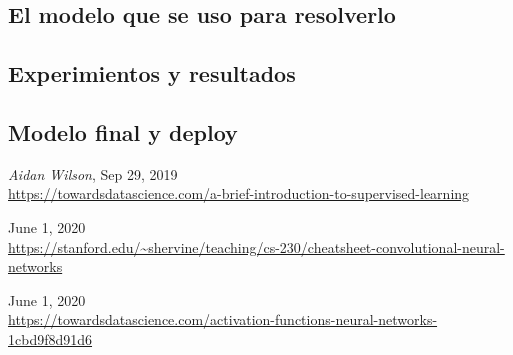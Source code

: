 \documentclass[10pt, fleqn, journal]{IEEEtran}
\theoremstyle{break}                                            %
\begin{document}
    \subsection{El modelo que se uso para resolverlo}

    \subsection{Experimientos y resultados}

    \subsection{Modelo final y deploy}

  \begin{thebibliography}{10}

      \textit{Aidan Wilson}, 
      Sep 29, 2019 \\
      \url{https://towardsdatascience.com/a-brief-introduction-to-supervised-learning}

      June 1, 2020 \\
      \url{https://stanford.edu/~shervine/teaching/cs-230/cheatsheet-convolutional-neural-networks}

      June 1, 2020 \\
      \url{https://towardsdatascience.com/activation-functions-neural-networks-1cbd9f8d91d6}

  \end{thebibliography}
\end{document}
